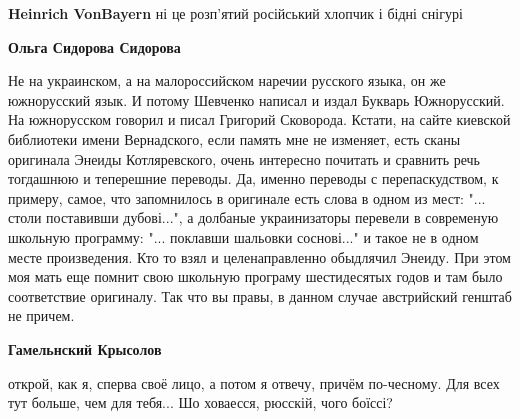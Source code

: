 \begin{itemize}
\begin{itemize}
 
\textbf{Heinrich VonBayern} ні це розп’ятий російський хлопчик і бідні снігурі

 
\textbf{Ольга Сидорова Сидорова} 

Не на украинском, а на малороссийском наречии русского языка, он же южнорусский
язык. И потому Шевченко написал и издал Букварь Южнорусский. На южнорусском
говорил и писал Григорий Сковорода. Кстати, на сайте киевской библиотеки имени
Вернадского, если память мне не изменяет, есть сканы оригинала Энеиды
Котляревского, очень интересно почитать и сравнить речь тогдашнюю и теперешние
переводы. Да, именно переводы с перепаскудством, к примеру, самое, что
запомнилось в оригинале есть слова в одном из мест: "... столи поставивши
дубові...", а долбаные украинизаторы перевели в современую школьную программу:
"... поклавши шальовки соснові..." и такое не в одном месте произведения. Кто
то взял и целенаправленно обыдлячил Энеиду. При этом моя мать еще помнит свою
школьную програму шестидесятых годов и там было соответствие оригиналу. Так что
вы правы, в данном случае австрийский генштаб не причем.

 
\textbf{Гамельнский Крысолов} 

открой, как я, сперва своё лицо, а потом я
отвечу, причём по-чесному. Для всех тут больше, чем для тебя... Шо ховаесся,
рюсскій, чого боїссі?

 

\end{itemize}
\end{itemize}
